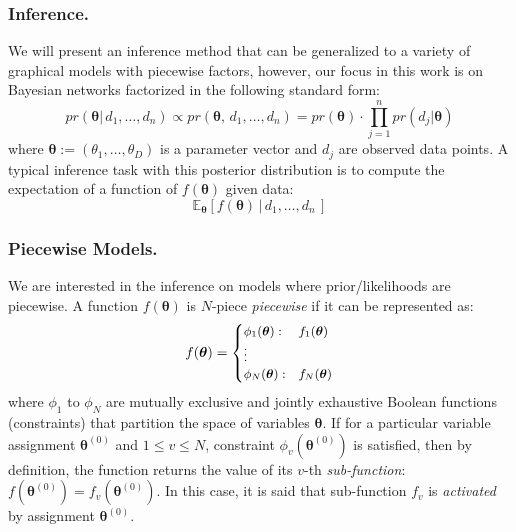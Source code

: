\documentclass[letterpaper]{article}
\def\paradot#1{\vspace{\paravsp plus 0.5\paravsp minus 0.5\paravsp}\noindent{\bf\boldmath{#1.}}}
\begin{document}
\subsubsection{Inference.} 
We will present an inference method that can be generalized to  
a variety of graphical models with piecewise factors, however, our focus in this
work is on Bayesian networks factorized in the following
standard form: 
{\footnotesize
\begin{equation}
\label{e:posterior}
pr(\boldsymbol\theta | \, d_1, \ldots, d_n) 
\propto
pr(\boldsymbol\theta, \, d_1, \ldots, d_n) 
= pr(\boldsymbol\theta) \cdot \prod_{j=1}^{n} pr(d_j | \boldsymbol\theta) 
\end{equation}
} 
\!\!where $\boldsymbol\theta := (\theta_1, \ldots, \theta_D)$ is a parameter vector and $d_j$ are observed data points. 
A typical inference task 
with this posterior distribution is to compute the expectation of a function of $f(\boldsymbol\theta)$ given data:
\begin{equation}
\label{e:prob.outcome}
\mathbb{E}_{\boldsymbol\theta}[f(\boldsymbol\theta) \,|\, d_1, \ldots, d_n \,]
\end{equation}


\subsubsection{Piecewise Models.}%
We are interested in the inference on models where prior/likelihoods are piecewise.
A function {\small$f(\boldsymbol{\theta})$} is {\small$N$}\!-piece \emph{piecewise} if it can be represented as:
\begin{equation}
\label{e:piecewise}
f(\boldsymbol{\theta}) = 
{\footnotesize
\begin{cases}
\phi_1(\boldsymbol{\theta}) : & f_1(\boldsymbol{\theta})\\
\vdots\\
\phi_N(\boldsymbol{\theta}) : & f_N(\boldsymbol{\theta})
\end{cases}
}%
\end{equation}
where $\phi_1$ to $\phi_N$ are mutually exclusive and jointly exhaustive Boolean functions (constraints) 
that partition the space of variables $\boldsymbol{\theta}$. If for a particular variable assignment $\boldsymbol{\theta}^{(0)}$ and $1\leq v \leq N$, constraint 
$\phi_v(\boldsymbol{\theta}^{(0)})$ is satisfied, then by definition, the function returns the value of its $v$-th \emph{sub-function}: $f(\boldsymbol{\theta}^{(0)}) = f_v(\boldsymbol{\theta}^{(0)})$.  
In this case, it is said that sub-function $f_v$ is \emph{activated} by assignment $\boldsymbol{\theta}^{(0)}$.
\end{document}
